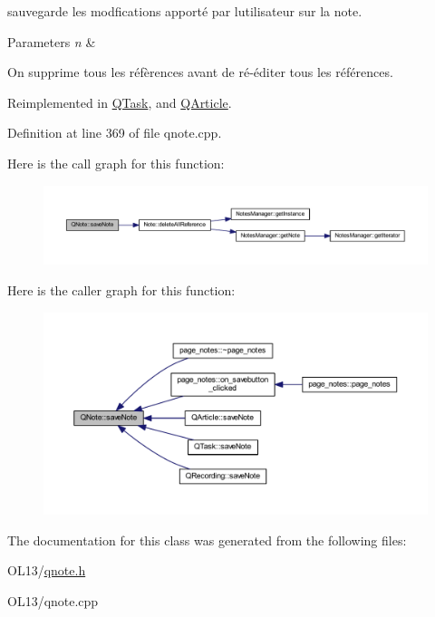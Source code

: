 sauvegarde les modfications apporté par l\textquotesingle{}utilisateur sur la note. 


\begin{DoxyParams}{Parameters}
{\em n} & \\
\hline
\end{DoxyParams}
On supprime tous les réfèrences avant de ré-\/éditer tous les références. 

Reimplemented in \hyperlink{class_q_task_ae304b097cdfd1169d2b190bbad3922eb}{Q\+Task}, and \hyperlink{class_q_article_ae59d03688947d16b86f9ab10384894ec}{Q\+Article}.



Definition at line 369 of file qnote.\+cpp.

Here is the call graph for this function\+:\nopagebreak
\begin{figure}[H]
\begin{center}
\leavevmode
\includegraphics[width=350pt]{class_q_note_a577f684ef199a17dc468d706b1383581_cgraph}
\end{center}
\end{figure}
Here is the caller graph for this function\+:\nopagebreak
\begin{figure}[H]
\begin{center}
\leavevmode
\includegraphics[width=350pt]{class_q_note_a577f684ef199a17dc468d706b1383581_icgraph}
\end{center}
\end{figure}


The documentation for this class was generated from the following files\+:\begin{DoxyCompactItemize}
\item 
O\+L13/\hyperlink{qnote_8h}{qnote.\+h}\item 
O\+L13/qnote.\+cpp\end{DoxyCompactItemize}

